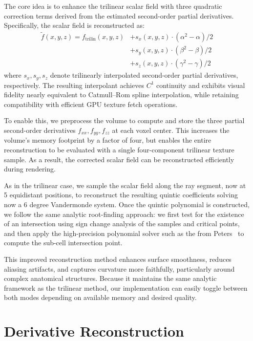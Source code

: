 \documentclass[conference]{IEEEtran}
\begin{document}
The core idea is to enhance the trilinear scalar field with three quadratic correction terms derived from the estimated second-order partial derivatives. Specifically, the scalar field is reconstructed as:
\begin{align}
\tilde{f}(x, y, z) = f_{\text{trilin}}(x, y, z)
& + s_{x}(x, y, z) \cdot (\alpha^2 - \alpha) / 2 \nonumber \\
& + s_{y}(x, y, z) \cdot (\beta^2 - \beta) / 2 \nonumber \\
& + s_{z}(x, y, z) \cdot (\gamma^2 - \gamma) / 2
\end{align}
where  \( s_{x}, s_{y}, s_{z} \) denote trilinearly interpolated second-order partial derivatives, respectively. The resulting interpolant achieves \( C^1 \) continuity and exhibits visual fidelity nearly equivalent to Catmull–Rom spline interpolation, while retaining compatibility with efficient GPU texture fetch operations.

To enable this, we preprocess the volume to compute and store the three partial second-order derivatives \( f_{xx}, f_{yy}, f_{zz} \) at each voxel center. This increases the volume’s memory footprint by a factor of four, but enables the entire reconstruction to be evaluated with a single four-component trilinear texture sample.  As a result, the corrected scalar field can be reconstructed efficiently during rendering.

As in the trilinear case, we sample the scalar field along the ray segment, now at 5 equidistant positions, to reconstruct the resulting quintic coefficients solving now a 6 degree Vandermonde system. Once the quintic polynomial is constructed, we follow the same analytic root-finding approach: we first test for the existence of an intersection using sign change analysis of the samples and critical points, and then apply the high-precision polynomial solver such as the from Peters~\cite{peters2023ray} to compute the sub-cell intersection point.

This improved reconstruction method enhances surface smoothness, reduces aliasing artifacts, and captures curvature more faithfully, particularly around complex anatomical structures. Because it maintains the same analytic framework as the trilinear method, our implementation can easily toggle between both modes depending on available memory and desired quality.


\section{Derivative Reconstruction}
\end{document}

